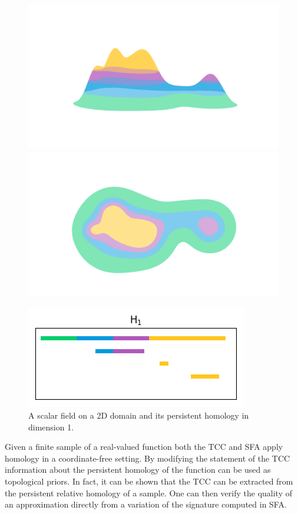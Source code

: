 \begin{figure}[htbp]
  \begin{minipage}{0.35\textwidth}
    \centering
    \includegraphics[trim=200 200 200 200, clip, width=0.8\linewidth]{figures/surf-side.png}
    \includegraphics[trim=200 100 200 150, clip, width=0.75\linewidth]{figures/surf-top.png}
  \end{minipage}
  \begin{minipage}{0.5\textwidth}
    \centering
    \includegraphics[width=\linewidth]{figures/scalar_barcode_H1.png}
  \end{minipage}
  \caption{A scalar field on a 2D domain and its persistent homology in dimension 1.}
\end{figure}

Given a finite sample of a real-valued function both the TCC and SFA apply homology in a coordinate-free setting.
By modifying the statement of the TCC information about the persistent homology of the function can be used as topological priors.
In fact, it can be shown that the TCC can be extracted from the persistent relative homology of a sample.
One can then verify the quality of an approximation directly from a variation of the signature computed in SFA.

